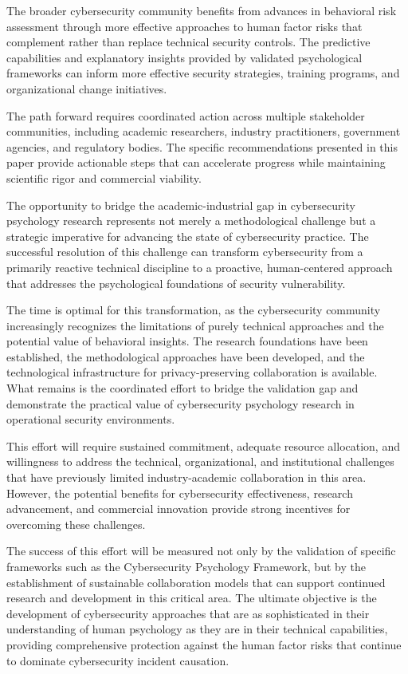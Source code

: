 \documentclass[10pt,twocolumn]{IEEEtran}
\begin{document}
The broader cybersecurity community benefits from advances in behavioral risk assessment through more effective approaches to human factor risks that complement rather than replace technical security controls. The predictive capabilities and explanatory insights provided by validated psychological frameworks can inform more effective security strategies, training programs, and organizational change initiatives.

The path forward requires coordinated action across multiple stakeholder communities, including academic researchers, industry practitioners, government agencies, and regulatory bodies. The specific recommendations presented in this paper provide actionable steps that can accelerate progress while maintaining scientific rigor and commercial viability.

The opportunity to bridge the academic-industrial gap in cybersecurity psychology research represents not merely a methodological challenge but a strategic imperative for advancing the state of cybersecurity practice. The successful resolution of this challenge can transform cybersecurity from a primarily reactive technical discipline to a proactive, human-centered approach that addresses the psychological foundations of security vulnerability.

The time is optimal for this transformation, as the cybersecurity community increasingly recognizes the limitations of purely technical approaches and the potential value of behavioral insights. The research foundations have been established, the methodological approaches have been developed, and the technological infrastructure for privacy-preserving collaboration is available. What remains is the coordinated effort to bridge the validation gap and demonstrate the practical value of cybersecurity psychology research in operational security environments.

This effort will require sustained commitment, adequate resource allocation, and willingness to address the technical, organizational, and institutional challenges that have previously limited industry-academic collaboration in this area. However, the potential benefits for cybersecurity effectiveness, research advancement, and commercial innovation provide strong incentives for overcoming these challenges.

The success of this effort will be measured not only by the validation of specific frameworks such as the Cybersecurity Psychology Framework, but by the establishment of sustainable collaboration models that can support continued research and development in this critical area. The ultimate objective is the development of cybersecurity approaches that are as sophisticated in their understanding of human psychology as they are in their technical capabilities, providing comprehensive protection against the human factor risks that continue to dominate cybersecurity incident causation.
\end{document}

